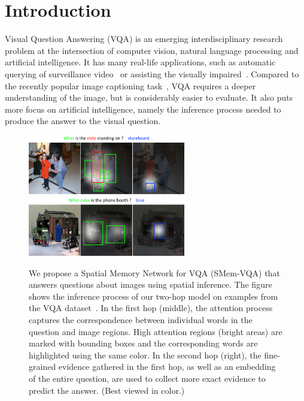 \section{Introduction}
Visual Question Answering (VQA) is an emerging interdisciplinary research problem at the intersection of computer vision, natural language processing and artificial intelligence. It has many real-life applications, such as automatic querying of surveillance video~\cite{tu2014joint} or assisting the visually impaired~\cite{lasecki2014increasing}. Compared to the recently popular image captioning task~\cite{donahue2014long,vinyals2014show,karpathy2014deep,fang2014captions}, VQA requires a deeper understanding of the image, but is considerably easier to evaluate. It also puts more focus on artificial intelligence, namely the inference process needed to produce the answer to the visual question.

\begin{figure}[!t]
\centering
\includegraphics[width=0.7\columnwidth,height=2.6cm]{figures/concept_graph.pdf}
\includegraphics[width=0.7\columnwidth,height=2.6cm]{figures/concept_graph2.pdf}
\vspace{-0.1in}
\caption{We propose a Spatial Memory Network for VQA (SMem-VQA) that answers questions about images using spatial inference.
The figure shows the inference process of our two-hop model on examples from the VQA dataset~\cite{DBLP:journals/corr/AntolALMBZP15}. In the first hop (middle), the attention process captures the correspondence between individual words in the question and image regions. High attention regions (bright areas) are marked with bounding boxes and the corresponding words are highlighted using the same color. In the second hop (right), the fine-grained evidence gathered in the first hop, as well as an embedding of the entire question, are used to collect more exact evidence to predict the answer. (Best viewed in color.) }
\label{fig:concept}
\vspace{-0.2in}
\end{figure}

